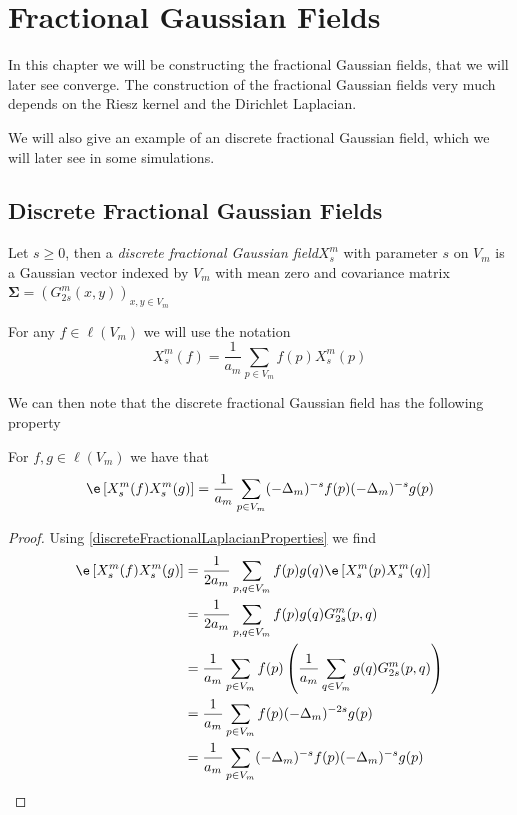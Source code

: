\chapter{Fractional Gaussian Fields}

In this chapter we will be constructing the fractional Gaussian fields, that we will later see converge. The construction of the fractional Gaussian fields very much depends on the Riesz kernel and the Dirichlet Laplacian.

We will also give an example of an discrete fractional Gaussian field, which we will later see in some simulations.

\section{Discrete Fractional Gaussian Fields}

\begin{defi}\label{fractionalGaussianFieldDiscrete}
	Let $s \geq 0$, then a \emph{discrete fractional Gaussian field}$ X_s^{m}$ with parameter $s$ on $V_m$ is a Gaussian vector indexed by $V_m$ with mean zero and covariance matrix $\mathbf{\Sigma} = \left(G_{2s}^{m}(x,y)\right)_{x,y \in V_m}$
\end{defi}

For any $f \in \ell(V_m)$ we will use the notation
\begin{equation}
	X_s^{m}(f) = \frac{1}{a_m}\sum_{p \in V_m}f(p)X^{m}_{s}(p)
\end{equation}


We can then note that the discrete fractional Gaussian field has the following property
\begin{prop}\label{theOneWeNeedInTheEndSomehow}
	For $f,g \in \ell(V_m)$ we have that
	\begin{equation}
		\e \left[X_s^{m}(f)X_s^{m}(g)\right] = \frac{1}{a_m} \sum_{p \in V_m} (-\Delta_{m})^{-s}f(p)(-\Delta_{m})^{-s}g(p)
	\end{equation}
\end{prop}
\begin{proof}
	Using \cref{discreteFractionalLaplacianProperties} we find
	\begin{align}
		\e \left[X_s^{m}(f)X_s^{m}(g)\right] &= \frac{1}{2a_m} \sum_{p,q \in V_m}f(p)g(q)\e\left[X_s^{m}(p)X_s^{m}(q)\right] \\
		&=  \frac{1}{2a_m} \sum_{p,q \in V_m}f(p)g(q)G_{2s}^{m}(p,q) \\
		&= \frac{1}{a_m} \sum_{p \in V_m}f(p)\left(\frac{1}{a_m} \sum_{q \in V_m}g(q)G_{2s}^{m}(p,q)\right) \\
		& = \frac{1}{a_m} \sum_{p \in V_m}f(p)(-\Delta_{m})^{-2s}g(p) \\
		& = \frac{1}{a_m} \sum_{p \in V_m} (-\Delta_{m})^{-s}f(p)(-\Delta_{m})^{-s}g(p)
	\end{align}
\end{proof}


